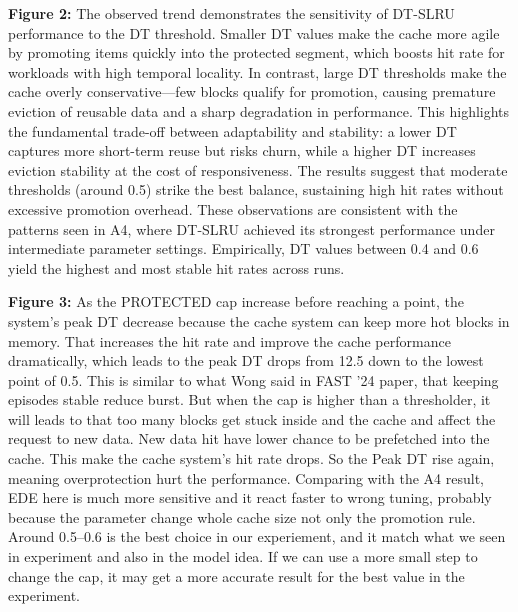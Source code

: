 \vspace{0.8em}
\textbf{Figure 2:} The observed trend demonstrates the sensitivity of DT-SLRU performance to the DT threshold. Smaller DT values make the cache more agile by promoting items quickly into the protected segment, which boosts hit rate for workloads with high temporal locality. In contrast, large DT thresholds make the cache overly conservative—few blocks qualify for promotion, causing premature eviction of reusable data and a sharp degradation in performance. This highlights the fundamental trade-off between adaptability and stability: a lower DT captures more short-term reuse but risks churn, while a higher DT increases eviction stability at the cost of responsiveness. The results suggest that moderate thresholds (around 0.5) strike the best balance, sustaining high hit rates without excessive promotion overhead. These observations are consistent with the patterns seen in A4, where DT-SLRU achieved its strongest performance under intermediate parameter settings. Empirically, DT values between 0.4 and 0.6 yield the highest and most stable hit rates across runs.

\vspace{0.8em}
\textbf{Figure 3:} As the PROTECTED cap increase before reaching a point, the system's peak DT decrease  because the cache system can keep more hot blocks in memory. That increases the hit rate and improve the cache performance dramatically, which leads to the peak DT drops from 12.5 down to the lowest point of 0.5. This is similar to what Wong said in FAST ’24 paper, that keeping episodes stable reduce burst. But when the cap is higher than a thresholder, it will leads to that too many blocks get stuck inside and the cache and affect the request to new data. New data hit have lower chance to be prefetched into the cache. This make the cache system's hit rate drops. So the Peak DT rise again, meaning overprotection hurt the performance. Comparing with the A4 result, EDE here is much more sensitive and it react faster to wrong tuning, probably because the parameter change whole cache size not only the promotion rule. Around 0.5–0.6 is the best choice in our experiement, and it match what we seen in experiment and also in the model idea. If we can use a more small step to change the cap, it may get a more accurate result for the best value in the experiment.

